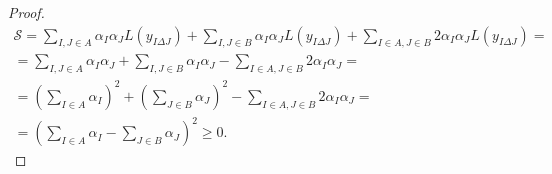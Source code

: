 \documentclass[a4paper,twoside,justified]{tufte-handout}
\begin{document}
\begin{proof}
\begin{equation*}
\begin{split}
\mathcal{S}=
\sum_{I, J\in A} \alpha_I \alpha_J L(y_{I\Delta J})+ \sum_{I, J\in B} \alpha_I \alpha_J L(y_{I\Delta J}) +\sum_{I\in A, J \in B} 2\alpha_I \alpha_J L(y_{I\Delta J})=
\\
=\sum_{I, J\in A} \alpha_I\alpha_J + \sum_{I, J\in B} \alpha_I \alpha_J -\sum_{I\in A, J \in B} 2\alpha_I \alpha_J=
\\
=\left(\sum_{I\in A} \alpha_I\right)^2 + \left(\sum_{J\in B} \alpha_J\right)^2 -\sum_{I\in A, J \in B} 2\alpha_I \alpha_J=
\\
=\left(\sum_{I\in A} \alpha_I -\sum_{J\in B}\alpha_J\right)^2\geq 0.
\end{split}
\end{equation*}
\end{proof}











\end{document}
